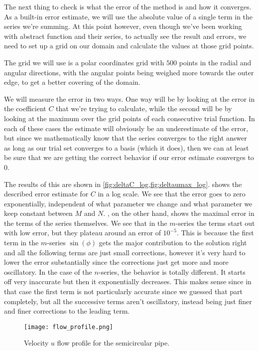 \documentclass[10pt,a4paper,twocolumn]{article}
\begin{document}
The next thing to check is what the error of the method is and how it converges. As a built-in error estimate, we will use the absolute value of a single term in the series we're summing. At this point however, even though we've been working with abstract function and their series, to actually see the result and errors, we need to set up a grid on our domain and calculate the values at those grid points.

The grid we will use is a polar coordinates grid with $500$ points in the radial and angular directions, with the angular points being weighed more towards the outer edge, to get a better covering of the domain.

We will measure the error in two ways. One way will be by looking at the error in the coefficient $C$ that we're trying to calculate, while the second will be by looking at the maximum over the grid points of each consecutive trial function. In each of these cases the estimate will obviously be an underestimate of the error, but since we mathematically know that the series converges to the right answer as long as our trial set converges to a basis (which it does), then we can at least be sure that we are getting the correct behavior if our error estimate converges to $0$.

The results of this are shown in \cref{fig:deltaC_log,fig:deltaumax_log}.  shows the described error estimate for $C$ in a log scale. We see that the error goes to zero exponentially, independent of what parameter we change and what parameter we keep constant between $M$ and $N$. , on the other hand, shows the maximal error in the terms of the series themselves. We see that in the $m$-series the terms start out with low error, but they plateau around an error of $10^{-5}$. This is because the first term in the $m$-series $\sin(\phi)$ gets the major contribution to the solution right and all the following terms are just small corrections, however it's very hard to lower the error substantially since the corrections just get more and more oscillatory. In the case of the $n$-series, the behavior is totally different. It starts off very inaccurate but then it exponentially decreases. This makes sense since in that case the first term is not particularly accurate since we guessed that part completely, but all the successive terms aren't oscillatory, instead being just finer and finer corrections to the leading term.

\begin{figure}
    \centering
    \captionsetup{justification=centering}
    \texttt{[image: flow\_profile.png]}
    \caption{Velocity $u$ flow profile for the semicircular pipe.}
    \label{fig:flow_profile}
\end{figure}
\end{document}
